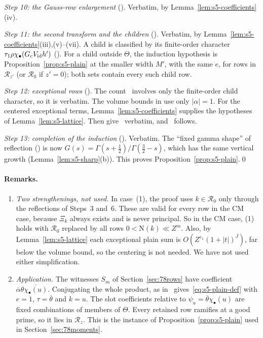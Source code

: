 \documentclass[11pt]{article}
\numberwithin{equation}{section}
\newcommand{\N}{\mathrm N}
\begin{document}
\emph{Step 10: the Gauss-row enlargement} (\cite[Section~18.5]{OAI78}). Verbatim, by
Lemma~\ref{lem:s5-coefficients}(iv).

\emph{Step 11: the second transform and the children} (\cite[Section~18.6]{OAI78}). Verbatim, by
Lemma~\ref{lem:s5-coefficients}(iii),(v)--(vii). A child is classified by its finite-order character
$\tau_1\rho\chi_\bullet(G_cV_{\rm id}h')$ (\cite[Section~18.6]{OAI78}). For a child outside $\Theta$, the induction
hypothesis is Proposition~\ref{prop:s5-plain} at the smaller width $M'$, with the same $e$, for rows in
$\mathcal R_{z'}$ (or $\mathcal R_0$ if $z'=0$); both sets contain every such child row.

\emph{Step 12: exceptional rows} (\cite[Section~18.7]{OAI78}). The count~\cite[eq.~(18.41)]{OAI78}
involves only the finite-order child character, so it is verbatim. The volume bounds in \cite[Section~18.7]{OAI78} use
only $|\alpha|=1$. For the centered exceptional terms, Lemma~\ref{lem:s5-coefficients} supplies the
hypotheses of Lemma~\ref{lem:s5-lattice}. Then \cite[Section~18.7]{OAI78} give~\cite[eq.~(18.48)]{OAI78} verbatim,
and~\cite[eq.~(18.50)]{OAI78} follows.

\emph{Step 13: completion of the induction} (\cite[Section~18.8]{OAI78}). Verbatim. The ``fixed gamma shape'' of
reflection (\cite[Section~18.8]{OAI78}) is now $G(s)=\Gamma(s+\frac12)/\Gamma(\frac32-s)$, which has the same vertical
growth (Lemma~\ref{lem:s5-sharp}(b)). This proves Proposition~\ref{prop:s5-plain}.\qed

\paragraph{Remarks.}
\begin{enumerate}
\item \emph{Two strengthenings, not used.} In case~(1), the proof uses $k\in\mathcal R_0$ only through the
 reflections of Steps~3 and~6. These are valid for every row in the CM case, because $\Xi_k$ always
 exists and is never principal. So in the CM case, (1) holds with $\mathcal R_0$ replaced by all rows
 $0<\N(k)\ll Z^m$. Also, by Lemma~\ref{lem:s5-lattice} each exceptional plain sum is
 $O(Z^{\varepsilon_1}(1+|t|)^J)$, far below the volume bound, so the centering is not needed. We have not
 used either simplification.
\item \emph{Application.} The witnesses $S_m$ of Section~\ref{sec:78rows} have coefficient
 $\overline\alpha\theta\overline{\chi_\bullet(u)}$. Conjugating the whole product, as
 in~\cite[Section~19.2]{OAI78} gives~\eqref{eq:s5-plain-def} with $e=1$, $\tau=\overline\theta$ and $k=u$.
 The slot coefficients relative to $\psi_u=\overline\theta\chi_\bullet(u)$ are fixed combinations of members
 of $\Theta$. Every retained row ramifies at a good prime, so it lies in $\mathcal R_z$. This is the
 instance of Proposition~\ref{prop:s5-plain} used in Section~\ref{sec:78moments}.
\end{enumerate}
\end{document}
